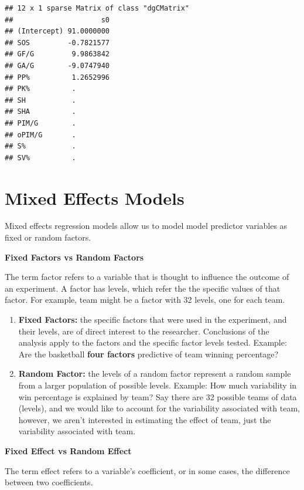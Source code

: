 \documentclass[
  11pt,
]{book}
\theoremstyle{definition}
\theoremstyle{definition}
\theoremstyle{definition}
\theoremstyle{definition}
\theoremstyle{remark}
\begin{document}
\begin{verbatim}
## 12 x 1 sparse Matrix of class "dgCMatrix"
##                     s0
## (Intercept) 91.0000000
## SOS         -0.7821577
## GF/G         9.9863842
## GA/G        -9.0747940
## PP%          1.2652996
## PK%          .        
## SH           .        
## SHA          .        
## PIM/G        .        
## oPIM/G       .        
## S%           .        
## SV%          .
\end{verbatim}

\newpage

\hypertarget{mixed-effects-models}{%
\section{Mixed Effects Models}\label{mixed-effects-models}}

Mixed effects regression models allow us to model model predictor variables as fixed or random factors.

\textbf{Fixed Factors vs Random Factors}

The term factor refers to a variable that is thought to influence the outcome of an experiment.
A factor has levels, which refer the the specific values of that factor. For example, team
might be a factor with 32 levels, one for each team.

\begin{enumerate}
\def\labelenumi{(\roman{enumi})}
\item
  \textbf{Fixed Factors:} the specific factors that were used in the experiment, and their levels,
  are of direct interest to the researcher. Conclusions of the analysis apply to the factors
  and the specific factor levels tested. Example: Are the basketball \textbf{four factors} predictive of team winning percentage?
\item
  \textbf{Random Factor:} the levels of a random factor represent a random sample from a
  larger population of possible levels. Example: How much variability in win percentage is explained
  by team? Say there are 32 possible teams of data (levels), and we would like to account for the variability associated with team, however, we aren't interested in estimating the effect of team, just the variability associated with team.
\end{enumerate}

\textbf{Fixed Effect vs Random Effect}

The term effect refers to a variable's coefficient, or in some cases, the difference between two
coefficients.
\end{document}
